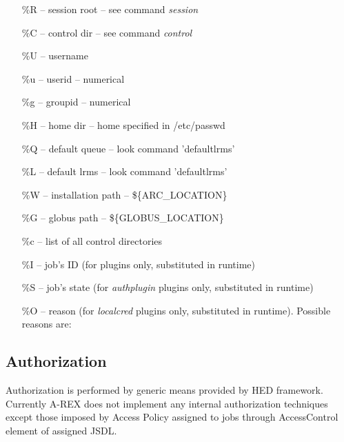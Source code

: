 \documentclass{article}                            %
\begin{document}
\begin{itemize}
\item [{\%R}] -- session root -- see command \emph{session}
\item [{\%C}] -- control dir -- see command \emph{control}
\item [{\%U}] -- username
\item [{\%u}] -- userid -- numerical
\item [{\%g}] -- groupid -- numerical
\item [{\%H}] -- home dir -- home specified in /etc/passwd
\item [{\%Q}] -- default queue -- look command 'defaultlrms'
\item [{\%L}] -- default lrms -- look command 'defaultlrms'
\item [{\%W}] -- installation path -- \$\{ARC\_LOCATION\}
\item [{\%G}] -- globus path -- \$\{GLOBUS\_LOCATION\}
\item [{\%c}] -- list of all control directories
\item [{\%I}] -- job's ID (for plugins only, substituted in runtime)
\item [{\%S}] -- job's state (for \emph{authplugin} plugins only, substituted
in runtime)
\item [{\%O}] -- reason (for \emph{localcred} plugins only, substituted
in runtime). Possible reasons are:
\end{itemize}

\subsection{Authorization\label{sub:Authorization}}

Authorization is performed by generic means provided by HED framework.
Currently A-REX does not implement any internal authorization techniques
except those imposed by Access Policy assigned to jobs through AccessControl
element of assigned JSDL.
\end{document}
